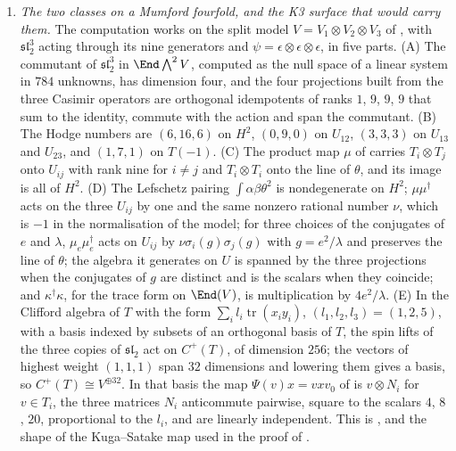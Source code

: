 \begin{enumerate}[label=\textup{(\Roman*)},leftmargin=*]
\item \emph{The two classes on a Mumford fourfold, and the K3 surface that
  would carry them.} The computation works on the split model
  $V=V_{1}\otimes V_{2}\otimes V_{3}$ of
  , with $\mathfrak{sl}_{2}^{3}$ acting through its nine
  generators and $\psi=\epsilon\otimes\epsilon\otimes\epsilon$, in five parts.
  (A) The commutant of $\mathfrak{sl}_{2}^{3}$ in $\End\bigwedge^{2}V$,
  computed as the null space of a linear system in $784$ unknowns, has
  dimension four, and the four projections built from the three Casimir
  operators are orthogonal idempotents of ranks $1$, $9$, $9$, $9$ that sum to
  the identity, commute with the action and span the commutant. (B) The Hodge
  numbers are $(6,16,6)$ on $H^{2}$, $(0,9,0)$ on $U_{12}$, $(3,3,3)$ on
  $U_{13}$ and $U_{23}$, and $(1,7,1)$ on $T(-1)$. (C) The product map $\mu$ of
   carries $T_{i}\otimes T_{j}$ onto $U_{ij}$ with rank nine
  for $i\ne j$ and $T_{i}\otimes T_{i}$ onto the line of $\theta$, and its
  image is all of $H^{2}$. (D) The Lefschetz pairing
  $\int\alpha\beta\theta^{2}$ is nondegenerate on $H^{2}$; $\mu\mu^{\dagger}$
  acts on the three $U_{ij}$ by one and the same nonzero rational number
  $\nu$, which is $-1$ in the normalisation of the model; for three choices of
  the conjugates of $e$ and $\lambda$, $\mu_{e}\mu_{e}^{\dagger}$ acts on
  $U_{ij}$ by $\nu\sigma_{i}(g)\sigma_{j}(g)$ with $g=e^{2}/\lambda$ and
  preserves the line of $\theta$; the algebra it generates on $U$ is spanned by
  the three projections when the conjugates of $g$ are distinct and is the
  scalars when they coincide; and $\kappa^{\dagger}\kappa$, for the trace form
  on $\End(V)$, is multiplication by $4e^{2}/\lambda$. (E) In the Clifford
  algebra of $T$ with the form $\sum_{i}l_{i}\operatorname{tr}(x_{i}y_{i})$,
  $(l_{1},l_{2},l_{3})=(1,2,5)$, with a basis indexed by subsets of an
  orthogonal basis of $T$, the spin lifts of the three copies of
  $\mathfrak{sl}_{2}$ act on $C^{+}(T)$, of dimension $256$; the vectors of highest weight $(1,1,1)$ span $32$
  dimensions and lowering them gives a basis, so $C^{+}(T)\cong V^{\oplus32}$.
  In that basis the map $\Psi(v)x=vxv_{0}$ of  is
  $v\otimes N_{i}$ for $v\in T_{i}$, the three matrices $N_{i}$ anticommute
  pairwise, square to the scalars $4$, $8$, $20$, proportional to the $l_{i}$,
  and are linearly independent. This is ,
   and the shape of the Kuga--Satake map used in the proof
  of .


\end{enumerate}
